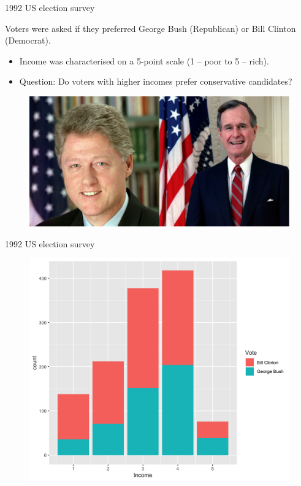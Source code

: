 \documentclass[pdf,handout]{beamer}
\begin{document}
\begin{frame}{1992 US election survey}

Voters were asked if they preferred George Bush (Republican) or Bill Clinton (Democrat). 
\vfill
\begin{itemize}
    \item  Income was characterised on a 5-point scale (1 – poor to 5 – rich). 
    \item Question: Do voters with higher incomes prefer conservative candidates?
\end{itemize}
\vfill
\begin{figure}
\includegraphics[width=.8\textwidth]{presidents.png}
\end{figure}

\end{frame}

\begin{frame}{1992 US election survey}

\begin{figure}
\includegraphics[width=.7\textwidth]{survey.png}
\end{figure}

\end{frame}
\end{document}
